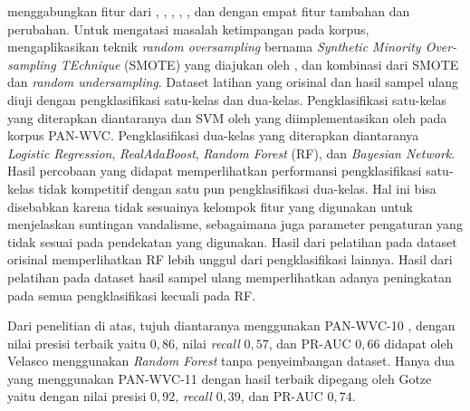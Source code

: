 \textcite{gotze2014advanced} menggabungkan fitur dari
\textcite{adler2011wikipedia},
\textcite{javanmardi2011vandalism},
\textcite{mola2012wikipedia},
\textcite{potthast2008automatic},
\textcite{wang2010got}, dan
\textcite{west2011multilingual} dengan empat fitur tambahan dan perubahan.
Untuk mengatasi masalah ketimpangan pada korpus,
\textcite{gotze2014advanced}
mengaplikasikan teknik
\textit{random oversampling}
bernama
\textit{Synthetic Minority Over-sampling TEchnique} (SMOTE)
yang diajukan oleh
\textcite{chawla2002smote},
dan kombinasi dari SMOTE dan
\textit{random undersampling}.
Dataset latihan yang orisinal dan hasil sampel ulang diuji dengan
pengklasifikasi satu-kelas dan dua-kelas.
Pengklasifikasi satu-kelas yang diterapkan diantaranya
\textcite{hempstalk2008one}
dan SVM oleh
\textcite{scholkopf1999support}
yang diimplementasikan oleh
\textcite{chang2011libsvm}
pada korpus PAN-WVC.
Pengklasifikasi dua-kelas yang diterapkan diantaranya
\textit{Logistic Regression},
\textit{RealAdaBoost},
\textit{Random Forest} (RF), dan
\textit{Bayesian Network}.
Hasil percobaan yang didapat memperlihatkan performansi pengklasifikasi
satu-kelas tidak kompetitif dengan satu pun pengklasifikasi dua-kelas.
Hal ini bisa disebabkan karena tidak sesuainya kelompok fitur yang digunakan
untuk menjelaskan suntingan vandalisme, sebagaimana juga parameter pengaturan
yang tidak sesuai pada pendekatan yang digunakan.
Hasil dari pelatihan pada dataset orisinal memperlihatkan RF
lebih unggul dari pengklasifikasi lainnya.
Hasil dari pelatihan pada dataset hasil sampel ulang memperlihatkan adanya
peningkatan pada semua pengklasifikasi kecuali pada RF.



Dari penelitian di atas, tujuh diantaranya menggunakan PAN-WVC-10
\parencites{adler2010detecting}
{adler2011wikipedia}
{gotze2014advanced}
{harpalani2011language}
{mola2012wikipedia}
{wang2010got}
{west2011multilingual},
dengan nilai presisi terbaik yaitu $0,86$, nilai \textit{recall} $0,57$, dan
PR-AUC $0,66$ didapat oleh Velasco menggunakan \textit{Random Forest} tanpa
penyeimbangan dataset.
Hanya dua yang menggunakan PAN-WVC-11
\parencites{gotze2014advanced}
{west2011multilingual}
dengan hasil terbaik dipegang oleh Gotze yaitu
dengan nilai presisi $0,92$, \textit{recall} $0,39$, dan PR-AUC $0,74$.
